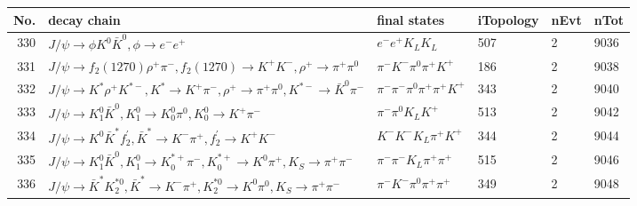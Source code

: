 \begin{table}[htbp] 
\begin{center}
\begin{small}
\begin{tabular}{rlllll}\hline\hline
 No. & decay chain & final states &  iTopology & nEvt & nTot \\\hline
330&$J/\psi       \rightarrow \phi           K^{0}          \bar{K}^{0}   , \phi            \rightarrow e^{-}        e^{+}        $&$e^{-}        e^{+}        K_{L}          K_{L}          $&  507&    2& 9036\\
331&$J/\psi       \rightarrow f_{2}(1270)    \rho^{+}      \pi^{-}        , f_{2}(1270)     \rightarrow K^{+}          K^{-}          , \rho^{+}       \rightarrow \pi^{+}        \pi^{0}        $&$\pi^{-}        K^{-}          \pi^{0}        \pi^{+}        K^{+}          $&  186&    2& 9038\\
332&$J/\psi       \rightarrow K^{*}          \rho^{+}      K^{*-}         , K^{*}           \rightarrow K^{+}          \pi^{-}        , \rho^{+}       \rightarrow \pi^{+}        \pi^{0}        , K^{*-}          \rightarrow \bar{K}^{0}   \pi^{-}        $&$\pi^{-}        \pi^{-}        \pi^{0}        \pi^{+}        \pi^{+}        K^{+}          $&  343&    2& 9040\\
333&$J/\psi       \rightarrow K_1^{0}        \bar{K}^{0}   , K_1^{0}         \rightarrow K_0^{0}        \pi^{0}        , K_0^{0}         \rightarrow K^{+}          \pi^{-}        $&$\pi^{-}        \pi^{0}        K_{L}          K^{+}          $&  513&    2& 9042\\
334&$J/\psi       \rightarrow K^{0}          \bar{K}^{*}   f_2^{'}       , \bar{K}^{*}    \rightarrow K^{-}          \pi^{+}        , f_2^{'}        \rightarrow K^{+}          K^{-}          $&$K^{-}          K^{-}          K_{L}          \pi^{+}        K^{+}          $&  344&    2& 9044\\
335&$J/\psi       \rightarrow K_1^{0}        \bar{K}^{0}   , K_1^{0}         \rightarrow K_{0}^{*+}     \pi^{-}        , K_{0}^{*+}      \rightarrow K^{0}          \pi^{+}        , K_{S}           \rightarrow \pi^{+}        \pi^{-}        $&$\pi^{-}        \pi^{-}        K_{L}          \pi^{+}        \pi^{+}        $&  515&    2& 9046\\
336&$J/\psi       \rightarrow \bar{K}^{*}   K_2^{*0}       , \bar{K}^{*}    \rightarrow K^{-}          \pi^{+}        , K_2^{*0}        \rightarrow K^{0}          \pi^{0}        , K_{S}           \rightarrow \pi^{+}        \pi^{-}        $&$\pi^{-}        K^{-}          \pi^{0}        \pi^{+}        \pi^{+}        $&  349&    2& 9048\\

\end{tabular}
\end{small}
\end{center}
\end{table}
